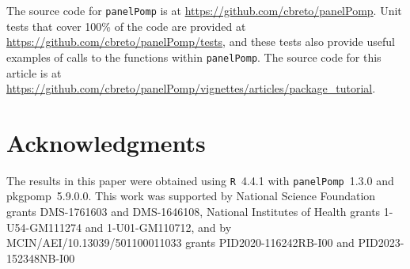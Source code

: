\documentclass[12pt]{article}\usepackage[]{graphicx}\usepackage[table]{xcolor}
\newcommand\pkg{\texttt}
\newcommand\R{\texttt{R}\xspace}
\newcommand\panelPomp{\texttt{panelPomp}\xspace}
\begin{document}
The source code for \panelPomp is at \url{https://github.com/cbreto/panelPomp}.
Unit tests that cover 100\% of the code are provided at \url{https://github.com/cbreto/panelPomp/tests}, and these tests also provide useful examples of calls to the functions within \panelPomp.
The source code for this article is at \url{https://github.com/cbreto/panelPomp/vignettes/articles/package_tutorial}.

\section*{Acknowledgments}
The results in this paper were obtained using \R~4.4.1 with \pkg{panelPomp}~1.3.0 and pkg{pomp}~5.9.0.0.
This work was supported by National Science Foundation grants DMS-1761603 and DMS-1646108, National Institutes of Health grants 1-U54-GM111274 and 1-U01-GM110712, and by MCIN/AEI/10.13039/501100011033 grants PID2020-116242RB-I00 and PID2023-152348NB-I00




\end{document}
